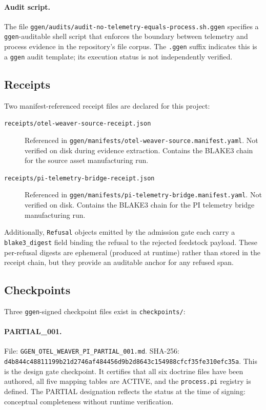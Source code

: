 \paragraph{Audit script.}
The file \texttt{ggen/audits/audit-no-telemetry-equals-process.sh.ggen} specifies a
\texttt{ggen}-auditable shell script that enforces the boundary between telemetry and
process evidence in the repository's file corpus. The \texttt{.ggen} suffix indicates this
is a \texttt{ggen} audit template; its execution status is not independently verified.

\subsection{Receipts}
\label{sec:otel-weaver-evidence-receipts}

Two manifest-referenced receipt files are declared for this project:

\begin{description}
  \item[\texttt{receipts/otel-weaver-source-receipt.json}] Referenced in
    \texttt{ggen/manifests/otel-weaver-source.manifest.yaml}. Not verified on disk during
    evidence extraction. Contains the BLAKE3 chain for the source asset manufacturing run.
  \item[\texttt{receipts/pi-telemetry-bridge-receipt.json}] Referenced in
    \texttt{ggen/manifests/pi-telemetry-bridge.manifest.yaml}. Not verified on disk. Contains
    the BLAKE3 chain for the PI telemetry bridge manufacturing run.
\end{description}

Additionally, \texttt{Refusal} objects emitted by the admission gate each carry a
\texttt{blake3\_digest} field binding the refusal to the rejected feedstock payload. These
per-refusal digests are ephemeral (produced at runtime) rather than stored in the receipt chain,
but they provide an auditable anchor for any refused span.

\subsection{Checkpoints}
\label{sec:otel-weaver-evidence-checkpoints}

Three \texttt{ggen}-signed checkpoint files exist in \texttt{checkpoints/}:

\paragraph{PARTIAL\_001.}
File: \texttt{GGEN\_OTEL\_WEAVER\_PI\_PARTIAL\_001.md}.
SHA-256: \texttt{d4b844c48811199b21d2746af484456d9b2d8643c154988cfcf35fe310efc35a}.
This is the design gate checkpoint. It certifies that all six doctrine files have been authored,
all five mapping tables are ACTIVE, and the \texttt{process.pi} registry is defined. The
PARTIAL designation reflects the status at the time of signing: conceptual completeness without
runtime verification.

